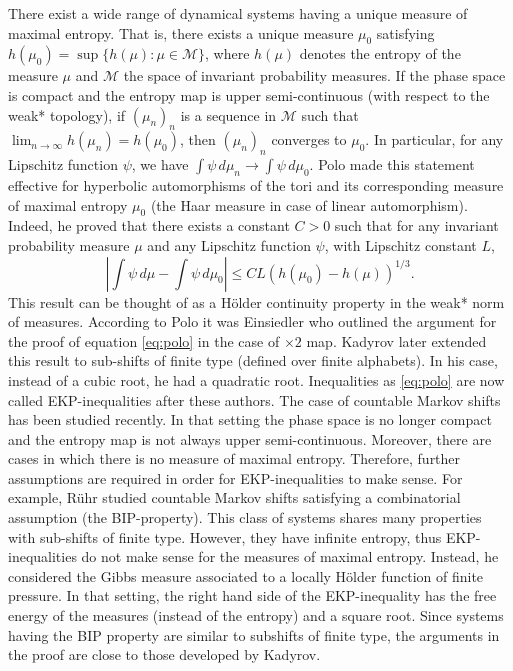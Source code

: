 \documentclass[12pt]{article}
\numberwithin{equation}{section}
\newcommand{\M}{\mathcal{M}}
\begin{document}
There exist a wide range of dynamical systems having a unique measure of maximal entropy. That is, there exists a unique measure $\mu_0$ satisfying $h(\mu_0)= \sup\{h(\mu) : \mu \in \M\}$, where $h(\mu)$ denotes the entropy of the measure $\mu$ and $\M$ the space of invariant probability measures. 
If the phase space is compact and  the entropy map is upper semi-continuous (with respect to the weak* topology), if  $(\mu_n)_n$ is a sequence in $\M$ such that $\lim_{n \to \infty} h(\mu_n)=h(\mu_0)$, then $(\mu_n)_n$ 
converges to $\mu_0$. In particular, for any Lipschitz  function $\psi$, we have
$\int \psi \, d \mu_n \rightarrow \int \psi \, d \mu_0$. Polo  \cite[Theorem 4.1.1]{Po11} made this statement effective for  hyperbolic automorphisms of the tori and its corresponding measure of maximal entropy  $\mu_0$ (the Haar measure in case of linear automorphism). Indeed, he proved that there exists a constant $C>0$ such that for any invariant probability measure $\mu$ and any Lipschitz function $\psi$, with Lipschitz constant $L$, 
\begin{equation} \label{eq:polo}
\left|	\int \psi \, d \mu - \int \psi \, d \mu_0	\right| \leq  CL \left(h(\mu_0)-h(\mu)	\right)^{1/3}.
\end{equation}
This result can be thought of as a H\"older continuity property in the weak* norm of measures.  According to Polo \cite[p.6]{Po11}  it was Einsiedler who outlined the argument for the proof of equation \eqref{eq:polo} in the case of $\times 2$ map. Kadyrov \cite[Theorem 1.1]{Kad15} later extended this result to sub-shifts of finite type (defined over finite alphabets). 
In his case, instead of a cubic root, he had a quadratic root.  
Inequalities as \eqref{eq:polo} are now called EKP-inequalities after these authors. 
The case of countable Markov shifts has been studied recently. In that setting the phase space is no longer compact 
and the entropy map is not always upper semi-continuous. Moreover, there  
are cases in  which there is no measure of maximal entropy. Therefore, further assumptions are required in order for 
EKP-inequalities to make sense. For example, R\"uhr \cite[Theorem 1.1]{Ruh21} studied countable Markov shifts satisfying a combinatorial assumption (the BIP-property). This class of systems shares many properties with sub-shifts of finite type. However, they  have infinite entropy, thus EKP-inequalities do not make sense for the measures of maximal entropy.  
Instead, he considered the Gibbs measure associated to a locally H\"older function of finite pressure. 
In that setting, the right hand side of the EKP-inequality has the free energy of the measures (instead of the entropy) 
and a square root. Since systems having the BIP property 
are similar to subshifts of finite type, the arguments in the proof are close to those developed by Kadyrov. 
\end{document}
